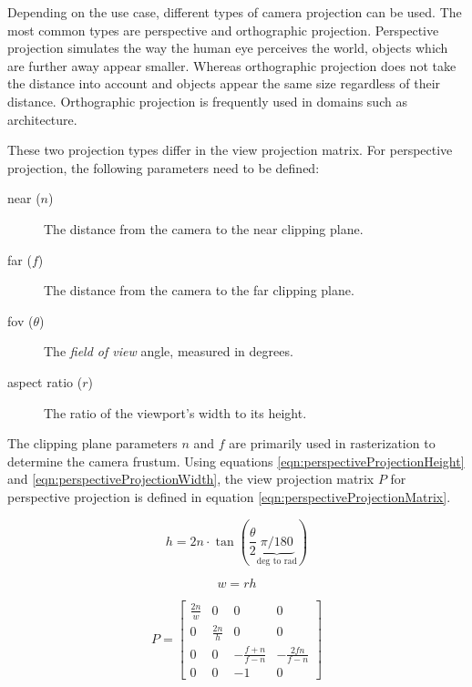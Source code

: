 Depending on the use case, different types of camera projection can be used. The most common types are perspective and orthographic projection. Perspective projection simulates the way the human eye perceives the world, objects which are further away appear smaller. Whereas orthographic projection does not take the distance into account and objects appear the same size regardless of their distance. Orthographic projection is frequently used in domains such as architecture.

These two projection types differ in the view projection matrix. For perspective projection, the following parameters need to be defined:

\begin{description}
    \item[near ($n$)] The distance from the camera to the near clipping plane.
    \item[far ($f$)] The distance from the camera to the far clipping plane.
    \item[fov ($\theta$)] The \textit{field of view} angle, measured in degrees.
    \item[aspect ratio ($r$)] The ratio of the viewport's width to its height.
\end{description}

The clipping plane parameters $n$ and $f$ are primarily used in rasterization to determine the camera frustum. Using equations \ref{eqn:perspectiveProjectionHeight} and \ref{eqn:perspectiveProjectionWidth}, the view projection matrix $P$ for perspective projection is defined in equation \ref{eqn:perspectiveProjectionMatrix}.

\begin{equation}
    \label{eqn:perspectiveProjectionHeight}
    h = 2n \cdot \tan(\frac{\theta}{2} \underbrace{\pi / 180}_{\text{deg to rad}})
\end{equation}

\begin{equation}
    \label{eqn:perspectiveProjectionWidth}
    w = rh
\end{equation}

\begin{equation}
    \label{eqn:perspectiveProjectionMatrix}
    P = 
    \begin{bmatrix}
        \frac{2n}{w} & 0 & 0 & 0 \\
        0 & \frac{2n}{h} & 0 & 0 \\
        0 & 0 & -\frac{f + n}{f - n} & -\frac{2fn}{f - n} \\
        0 & 0 & -1 & 0
    \end{bmatrix}
\end{equation}

